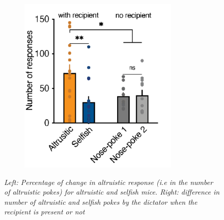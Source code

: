 \documentclass[a4paper]{article}
\begin{document}
\begin{figure}[H]
\begin{minipage}{\linewidth}
\begin{minipage}{0.46\linewidth}
\begin{figure}[H]
			\end{figure}
		\end{minipage}
		\hspace{0.05\linewidth}
		\begin{minipage}{0.46\linewidth}
			\begin{figure}[H]
				\includegraphics[width=\linewidth]{norecip.png}
				
			\end{figure}
		\end{minipage}
		
	\end{minipage}
	\caption{\textit{Left: Percentage of change in altruistic response (i.e in the number of altruistic pokes) for altruistic and selfish mice. Right: difference in number of altruistic and selfish pokes by the dictator when the recipient is present or not}}
\end{figure}
\end{document}
